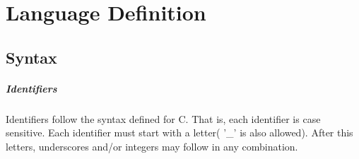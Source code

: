 \documentclass{report}
\begin{document}
\tableofcontents

\chapter{Language Definition}
\section{Syntax}
\paragraph{Identifiers}
Identifiers follow the syntax defined for C. That is, each identifier is case sensitive. Each identifier must start with a letter( '\_' is also allowed). After this letters, underscores and/or integers may follow in any combination.
\end{document}
